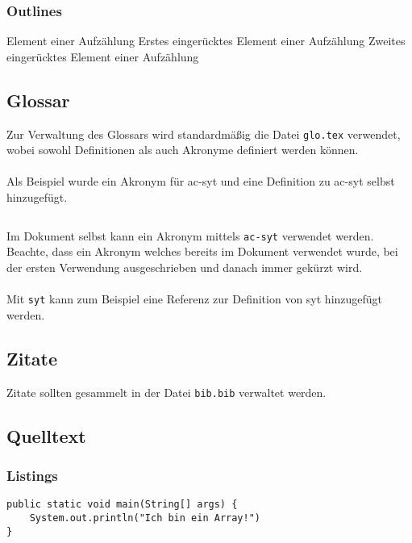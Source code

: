 \subsubsection{Outlines}
\begin{outline}
    \1 Element einer Aufzählung
        \2 Erstes eingerücktes Element einer Aufzählung
        \2 Zweites eingerücktes Element einer Aufzählung
\end{outline}

\newpage
\subsection{Glossar}
Zur Verwaltung des Glossars wird standardmäßig die Datei \texttt{glo.tex} verwendet, wobei sowohl Definitionen als auch Akronyme definiert werden können.
\\\\
Als Beispiel wurde ein Akronym für \gls{ac-syt} und eine Definition zu \gls{ac-syt} selbst hinzugefügt.

\inputminted{latex}{glo.tex}

Im Dokument selbst kann ein Akronym mittels \texttt{\gls{ac-syt}} verwendet werden. Beachte, dass ein Akronym welches bereits im Dokument verwendet wurde, bei der ersten Verwendung ausgeschrieben und danach immer gekürzt wird.
\\\\
Mit \texttt{\gls{syt}} kann zum Beispiel eine Referenz zur Definition von \gls{syt} hinzugefügt werden.

\subsection{Zitate}
Zitate sollten gesammelt in der Datei \texttt{bib.bib} verwaltet werden.

\newpage
\subsection{Quelltext}
\subsubsection{Listings}
\begin{listing}[H]
\begin{lstlisting}[style=Java, caption=Java Listing]
public static void main(String[] args) {
    System.out.println("Ich bin ein Array!")
}
\end{lstlisting}
\end{listing}

